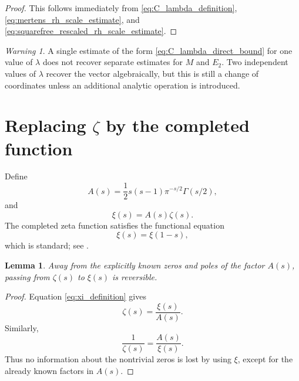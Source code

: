 \documentclass[11pt]{amsart}
\numberwithin{equation}{section}
\theoremstyle{plain}
\newtheorem{lemma}[theorem]{Lemma}
\theoremstyle{definition}
\theoremstyle{remark}
\newtheorem{warning}[theorem]{Warning}
\begin{document}
\begin{proof}
This follows immediately from \eqref{eq:C_lambda_definition}, \eqref{eq:mertens_rh_scale_estimate}, and \eqref{eq:squarefree_rescaled_rh_scale_estimate}.
\end{proof}

\begin{warning}
\label{warn:no_reverse_from_single_lambda}
A single estimate of the form \eqref{eq:C_lambda_direct_bound} for one value of \(\lambda\) does not recover separate estimates for \(M\) and \(E_2\).  Two independent values of \(\lambda\) recover the vector algebraically, but this is still a change of coordinates unless an additional analytic operation is introduced.
\end{warning}

\section{Replacing \texorpdfstring{$\zeta$}{zeta} by the completed function}
\label{sec:completed_function_replacement}

Define
\begin{equation}
A(s)=\frac12s(s-1)\pi^{-s/2}\Gamma(s/2),
\label{eq:A_definition}
\end{equation}
and
\begin{equation}
\xi(s)=A(s)\zeta(s).
\label{eq:xi_definition}
\end{equation}
The completed zeta function satisfies the functional equation
\begin{equation}
\xi(s)=\xi(1-s),
\label{eq:xi_functional_equation}
\end{equation}
which is standard; see \cite{Titchmarsh1986,Edwards1974,IwaniecKowalski2004}.

\begin{lemma}
\label{lem:xi_reversible}
Away from the explicitly known zeros and poles of the factor \(A(s)\), passing from \(\zeta(s)\) to \(\xi(s)\) is reversible.
\end{lemma}

\begin{proof}
Equation \eqref{eq:xi_definition} gives
\begin{equation}
\zeta(s)=\frac{\xi(s)}{A(s)}.
\label{eq:zeta_recovered_from_xi}
\end{equation}
Similarly,
\begin{equation}
\frac1{\zeta(s)}=\frac{A(s)}{\xi(s)}.
\label{eq:inverse_zeta_from_xi}
\end{equation}
Thus no information about the nontrivial zeros is lost by using \(\xi\), except for the already known factors in \(A(s)\).
\end{proof}
\end{document}
